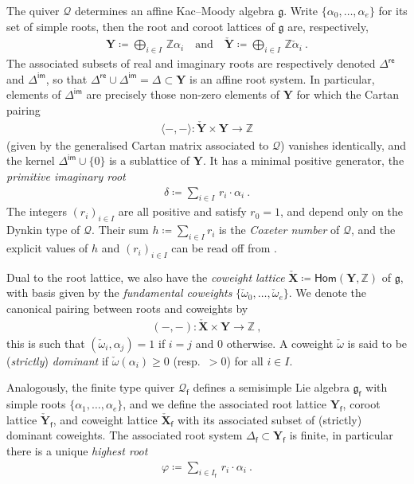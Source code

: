 \documentclass[reqno,a4paper]{amsart}
\newcommand{\Z}{\mathbb{Z}}
\newcommand{\sff}{\mathsf{f}}
\newcommand{\frakg}{\mathfrak{g}}
\newcommand{\bfY}{\mathbf{Y}}
\newcommand{\bfX}{\mathbf{X}}
\newcommand{\qv}{\mathcal{Q}}
\newcommand{\qvfin}{\mathcal{Q}_\sff}
\newcommand{\Lomega}{\check{\omega}}
\newcommand{\rootset}{\Delta}
\newcommand{\rootsetre}{\rootset^{\mathsf{re}}}
\newcommand{\rootsetim}{\rootset^{\mathsf{im}}}
\newcommand{\rootsetfin}{\rootset_\sff}
\newcommand{\rootlattice}{\bfY}
\newcommand{\corootlattice}{\check{\bfY}}
\newcommand{\rootlatticefin}{\rootlattice_\sff}
\newcommand{\corootlatticefin}{\check{\rootlattice}_\sff}
\newcommand{\weightlattice}{\bfX}
\newcommand{\coweightlattice}{\check{\weightlattice}}
\newcommand{\coweightlatticefin}{\coweightlattice_\sff}
\newcommand{\frakgfin}{\frakg_\sff}
\newcommand{\Hom}{\mathsf{Hom}}
\theoremstyle{basic-theorem}
\numberwithin{equation}{section}
\begin{document}
The quiver $\qv$ determines an affine Kac--Moody algebra $\frakg$. Write $\{\alpha_0,\ldots,\alpha_e\}$ for its set of simple roots, then the root and coroot lattices of $\frakg$ are, respectively,
\begin{align}
	\rootlattice\coloneqq\bigoplus_{i\in I}\, \Z \alpha_i \quad \text{and} \quad \corootlattice\coloneqq\bigoplus_{i \in I}\, \Z\check{\alpha}_i\ .
\end{align}
The associated subsets of real and imaginary roots are respectively denoted $\rootsetre$ and $\rootsetim$, so that $\rootsetre\cup \rootsetim=\Delta\subset \rootlattice$ is an affine root system. In particular, elements of $\rootsetim$ are precisely those non-zero elements of $\rootlattice$ for which the Cartan pairing
\begin{align}\label{eq:cartan-pairing}
	\langle -, - \rangle\colon \corootlattice\times \rootlattice\longrightarrow \Z
\end{align}
(given by the generalised Cartan matrix associated to $\qv$) vanishes identically, and the kernel $\rootsetim\cup \{0\}$ is a sublattice of $\rootlattice$. It has a minimal positive generator, the \textit{primitive imaginary root}
\begin{align}\label{eq:r_i}
	\delta\coloneqq \sum_{i\in I}\,r_i \cdot \alpha_i\ .
\end{align}
The integers $(r_i)_{i\in I}$ are all positive and satisfy $r_0=1$, and depend only on the Dynkin type of $\qv$. Their sum $h\coloneqq \sum_{i\in I}r_i$ is the \textit{Coxeter number} of $\qv$, and the explicit values of $h$ and $(r_i)_{i\in I}$ can be read off from \cite[Table~Z]{kacInfiniteRootSystems}.

Dual to the root lattice, we also have the \textit{coweight lattice} $\coweightlattice\coloneqq \Hom(\rootlattice,\Z)$ of $\frakg$, with basis given by the \textit{fundamental coweights} $\{\Lomega_0,\ldots,\Lomega_e\}$. We denote the canonical pairing between roots and coweights by
\begin{align}\label{eq:canonical-pairing}
	(-, -)\colon \coweightlattice\times \rootlattice\longrightarrow \Z\ ,
\end{align}
this is such that $(\Lomega_i, \alpha_j)=1$ if $i=j$ and $0$ otherwise. A coweight $\Lomega$ is said to be (\textit{strictly}) \textit{dominant} if $\Lomega(\alpha_i)\geq 0$ (resp.\ $>0$) for all $i\in I$.

Analogously, the finite type quiver $\qvfin$ defines a semisimple Lie algebra $\frakgfin$ with simple roots $\{\alpha_1,\ldots,\alpha_e\}$, and we define the associated root lattice $\rootlatticefin$, coroot lattice $\corootlatticefin$, and coweight lattice $\coweightlatticefin$ with its associated subset of (strictly) dominant coweights. The associated root system $\rootsetfin\subset\rootlatticefin$ is finite, in particular there is a unique \textit{highest root}
\begin{align}
	\varphi \coloneqq \sum_{i\in I_\sff}\,r_i\cdot \alpha_i\ .
\end{align}
\end{document}
